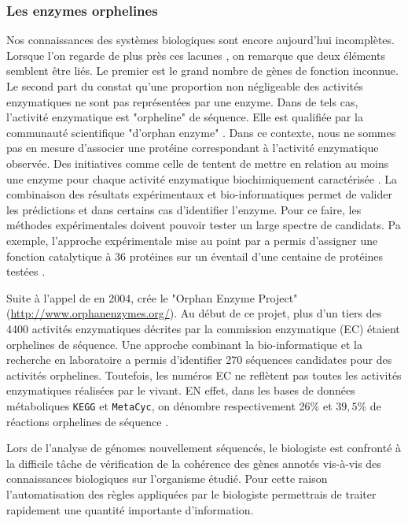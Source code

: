 \begin{refsegment}
    
    \subsubsection{Les enzymes orphelines}
    
    Nos connaissances des systèmes biologiques sont encore aujourd'hui incomplètes. Lorsque l'on regarde de plus près ces lacunes , on remarque que deux éléments semblent être liés. Le premier est le grand nombre de gènes de fonction inconnue. Le second part du constat qu'une proportion non négligeable des activités enzymatiques ne sont pas représentées par une enzyme. Dans de tels cas, l'activité enzymatique est "orpheline" de séquence. Elle est qualifiée par la communauté scientifique "d'orphan enzyme" \cite{lespinet2005orphan}. Dans ce contexte, nous ne sommes pas en mesure d'associer une protéine correspondant à l'activité enzymatique observée. Des initiatives comme celle de \citeauthor{karp2004call} tentent de mettre en relation au moins une enzyme pour chaque activité enzymatique biochimiquement caractérisée \cite{karp2004call}. La combinaison des résultats expérimentaux et bio-informatiques permet de valider les prédictions et dans certains cas d'identifier l'enzyme. Pour ce faire, les méthodes expérimentales doivent pouvoir tester un large spectre de candidats. Pa exemple, l'approche expérimentale mise au point par \citeauthor{kuznetsova2005enzyme} a permis d'assigner une fonction catalytique à 36 protéines sur un éventail d'une centaine de protéines testées \cite{kuznetsova2005enzyme}.
    
    Suite à l'appel de \citeauthor{karp2004call} en 2004, \citeauthor{shearer2014finding} crée le "Orphan Enzyme Project" (\url{http://www.orphanenzymes.org/}). Au début de ce projet, plus d'un tiers des 4400 activités enzymatiques décrites par la commission enzymatique (\gls{EC}) étaient orphelines de séquence. Une approche combinant la bio-informatique et la recherche en laboratoire a permis d'identifier 270 séquences candidates pour des activités orphelines\cite{shearer2014finding}. Toutefois, les numéros \gls{EC} ne reflètent pas toutes les activités enzymatiques réalisées par le vivant. EN effet, dans les bases de données métaboliques \texttt{KEGG} et \texttt{MetaCyc}, on dénombre  respectivement 26\% et $39,5$\% de réactions orphelines de séquence \cite{sorokina2014profiling}.
    
    Lors de l'analyse de génomes nouvellement séquencés, le biologiste est confronté à la difficile tâche de vérification de la cohérence des gènes annotés vis-à-vis des connaissances biologiques sur l'organisme étudié. Pour cette raison l'automatisation des règles appliquées par le biologiste permettrais de traiter rapidement une quantité importante d'information.
    

\end{refsegment}

